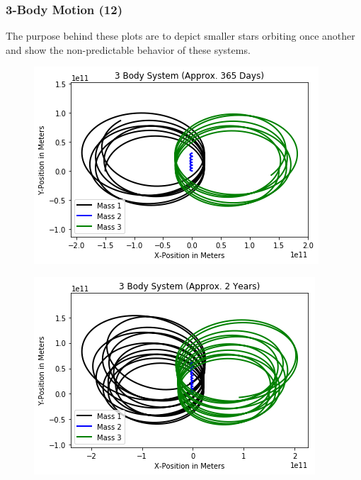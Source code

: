 \documentclass{beamer}
\begin{document}
\begin{frame}
\frametitle{3-Body Motion (12)}
The purpose behind these plots are to depict smaller stars orbiting once another and show the non-predictable behavior of these systems.
\begin{multicols}{2}
\begin{figure}
\begin{center}
\includegraphics[width=1.0\linewidth]{3BodyDynamics10.png}
\end{center}
\end{figure}
\begin{figure}
\begin{center}
\includegraphics[width=1.0\linewidth]{3BodyDynamics11.png}
\end{center}
\end{figure}
\end{multicols}
\end{frame}
\end{document}
